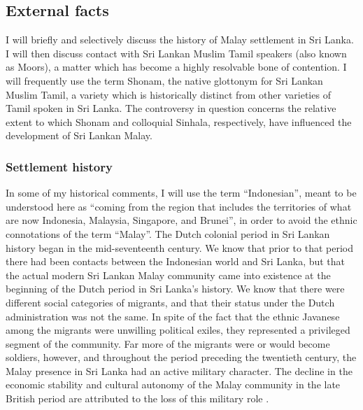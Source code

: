 \subsection{External facts}%

I will briefly and selectively discuss the history of Malay settlement in Sri Lanka. I will then discuss contact with Sri Lankan Muslim Tamil speakers (also known as Moors), a matter which has become a highly resolvable bone of contention. I will frequently use the term Shonam, the native glottonym for Sri Lankan Muslim Tamil, a variety which is historically distinct from other varieties of Tamil spoken in Sri Lanka. The controversy in question concerns the relative extent to which Shonam and colloquial Sinhala, respectively, have influenced the development of Sri Lankan Malay.

\subsubsection{Settlement history}%

In some of my historical comments, I will use the term ``Indonesian'', meant to be understood here as ``coming from the region that includes the territories of what are now Indonesia, Malaysia, Singapore, and Brunei'', in order to avoid the ethnic connotations of the term ``Malay''. The Dutch colonial period in Sri Lankan history began in the mid-seventeenth century. We know that prior to that period there had been contacts between the Indonesian world and Sri Lanka, but that the actual modern Sri Lankan Malay community came into existence at the beginning of the Dutch period in Sri Lanka's history. We know that there were different social categories of migrants, and that their status under the Dutch administration was not the same. In spite of the fact that the ethnic Javanese among the migrants were unwilling political exiles, they represented a privileged segment of the community. Far more of the migrants were or would become soldiers, however, and throughout the period preceding the twentieth century, the Malay presence in Sri Lanka had an active military character. The decline in the economic stability and cultural autonomy of the Malay community in the late British period are attributed to the loss of this military role \citep{Hussainmiya1987,Hussainmiya1990}.

